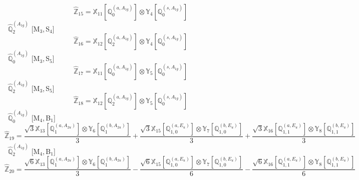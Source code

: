 \documentclass[fleqn,10pt,landscape]{article}
\begin{document}
\begin{itemize}
\begin{dmath*}
\hat{\mathbb{Z}}_{15}=\mathbb{X}_{11}[\mathbb{Q}_{0}^{(a,A_{1g})}] \otimes\mathbb{Y}_{4}[\mathbb{Q}_{0}^{(s,A_{1g})}]
\end{dmath*}
\vspace{4mm}
\noindent {} $\,\,\,\hat{\mathbb{Q}}_{2}^{(A_{1g})}$ [M$_{3}$,\,S$_{4}$]
\begin{dmath*}
\hat{\mathbb{Z}}_{16}=\mathbb{X}_{12}[\mathbb{Q}_{2}^{(a,A_{1g})}] \otimes\mathbb{Y}_{4}[\mathbb{Q}_{0}^{(s,A_{1g})}]
\end{dmath*}
\vspace{4mm}
\noindent {} $\,\,\,\hat{\mathbb{Q}}_{0}^{(A_{1g})}$ [M$_{3}$,\,S$_{5}$]
\begin{dmath*}
\hat{\mathbb{Z}}_{17}=\mathbb{X}_{11}[\mathbb{Q}_{0}^{(a,A_{1g})}] \otimes\mathbb{Y}_{5}[\mathbb{Q}_{0}^{(s,A_{1g})}]
\end{dmath*}
\vspace{4mm}
\noindent {} $\,\,\,\hat{\mathbb{Q}}_{2}^{(A_{1g})}$ [M$_{3}$,\,S$_{5}$]
\begin{dmath*}
\hat{\mathbb{Z}}_{18}=\mathbb{X}_{12}[\mathbb{Q}_{2}^{(a,A_{1g})}] \otimes\mathbb{Y}_{5}[\mathbb{Q}_{0}^{(s,A_{1g})}]
\end{dmath*}
\vspace{4mm}
\noindent {} $\,\,\,\hat{\mathbb{Q}}_{0}^{(A_{1g})}$ [M$_{4}$,\,B$_{1}$]
\begin{dmath*}
\hat{\mathbb{Z}}_{19}=\frac{\sqrt{3} \mathbb{X}_{13}[\mathbb{Q}_{1}^{(a,A_{2u})}] \otimes\mathbb{Y}_{6}[\mathbb{Q}_{1}^{(b,A_{2u})}]}{3} + \frac{\sqrt{3} \mathbb{X}_{15}[\mathbb{Q}_{1,0}^{(a,E_{u})}] \otimes\mathbb{Y}_{7}[\mathbb{Q}_{1,0}^{(b,E_{u})}]}{3} + \frac{\sqrt{3} \mathbb{X}_{16}[\mathbb{Q}_{1,1}^{(a,E_{u})}] \otimes\mathbb{Y}_{8}[\mathbb{Q}_{1,1}^{(b,E_{u})}]}{3}
\end{dmath*}
\vspace{4mm}
\noindent {} $\,\,\,\hat{\mathbb{Q}}_{2}^{(A_{1g})}$ [M$_{4}$,\,B$_{1}$]
\begin{dmath*}
\hat{\mathbb{Z}}_{20}=\frac{\sqrt{6} \mathbb{X}_{13}[\mathbb{Q}_{1}^{(a,A_{2u})}] \otimes\mathbb{Y}_{6}[\mathbb{Q}_{1}^{(b,A_{2u})}]}{3} - \frac{\sqrt{6} \mathbb{X}_{15}[\mathbb{Q}_{1,0}^{(a,E_{u})}] \otimes\mathbb{Y}_{7}[\mathbb{Q}_{1,0}^{(b,E_{u})}]}{6} - \frac{\sqrt{6} \mathbb{X}_{16}[\mathbb{Q}_{1,1}^{(a,E_{u})}] \otimes\mathbb{Y}_{8}[\mathbb{Q}_{1,1}^{(b,E_{u})}]}{6}
\end{dmath*}
\vspace{4mm}

\end{itemize}
\end{document}
